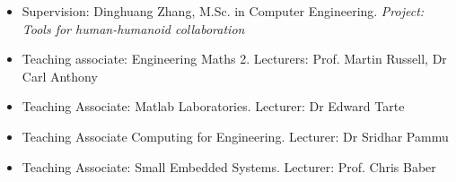 \documentclass{mycv}
\begin{document}
\begin{itemize}
\item 	Supervision: Dinghuang Zhang, M.Sc. in Computer Engineering.
	\textit{Project: Tools for human-humanoid collaboration}
\item Teaching associate: Engineering Maths 2. Lecturers: Prof. Martin Russell, Dr Carl Anthony 
\item Teaching Associate: Matlab Laboratories. Lecturer: Dr Edward Tarte  
\item Teaching Associate Computing for Engineering. Lecturer: Dr Sridhar Pammu  
\item Teaching Associate: Small Embedded Systems. Lecturer: Prof. Chris Baber  
\end{itemize}

\end{document}
